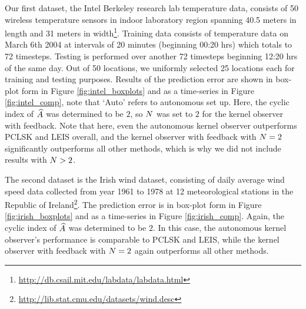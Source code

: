 Our first dataset, the Intel Berkeley research lab temperature data, consists of 50 wireless temperature sensors in indoor laboratory region spanning 40.5 meters in length and 31 meters in width\footnote{\url{http://db.csail.mit.edu/labdata/labdata.html}}. Training data consists of temperature data on March 6th 2004 at intervals of 20 minutes (beginning 00:20 hrs) which totals to 72 timesteps. Testing is performed over another 72 timesteps beginning 12:20 hrs of the same day. Out of 50 locations, we uniformly selected 25 locations each for training and testing purposes. Results of the prediction error are shown in box-plot form in Figure \ref{fig:intel_boxplots} and as a time-series in Figure \ref{fig:intel_comp}, note that `Auto' refers to autonomous set up. Here, the cyclic index of $\widehat{A}$ was determined to be $2$, so $N$ was set to $2$ for the kernel observer with feedback. Note that here, even the autonomous kernel observer outperforms PCLSK and LEIS overall, and the kernel observer with feedback with $N = 2$ significantly outperforms all other methods, which is why we did not include results with $N > 2$. 
%
%




The second dataset is the Irish wind dataset, consisting of daily average
wind speed %
data collected from year
1961 to 1978 at 12 meteorological stations in the Republic
of Ireland\footnote{\url{http://lib.stat.cmu.edu/datasets/wind.desc}}. The prediction error  is in box-plot form in Figure \ref{fig:irish_boxplots} and as a time-series in Figure \ref{fig:irish_comp}. Again, the cyclic index of $\widehat{A}$ was determined to be $2$. In this case, the autonomous kernel observer's performance is comparable to PCLSK and LEIS, while the kernel observer with feedback with $N = 2$ again outperforms all other methods. 

